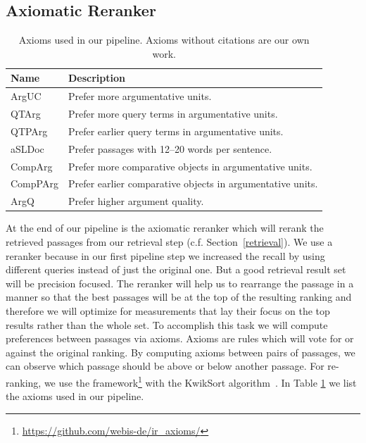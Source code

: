 \subsection{Axiomatic Reranker}

\begin{table}
    \caption{Axioms used in our pipeline. Axioms without citations are our own work.}
    \label{table-axioms}
    \begin{tabular}{ll}
        \toprule
        \textbf{Name} & \textbf{Description} \\
        \midrule
        ArgUC~\cite{BondarenkoHVSPB2018} & Prefer more argumentative units. \\
        QTArg~\cite{BondarenkoHVSPB2018} & Prefer more query terms in argumentative units. \\
        QTPArg~\cite{BondarenkoHVSPB2018} & Prefer earlier query terms in argumentative units. \\
        aSLDoc~\cite{BondarenkoFKHVS2019} & Prefer passages with 12--20 words per sentence. \\
        CompArg & Prefer more comparative objects in argumentative units. \\
        CompPArg & Prefer earlier comparative objects in argumentative units. \\
        ArgQ & Prefer higher argument quality. \\ 
        \bottomrule
    \end{tabular}
\end{table}

At the end of our pipeline is the axiomatic reranker which will rerank the retrieved passages from our retrieval step (c.f. Section~\ref{retrieval}).
We use a reranker because in our first pipeline step we increased the recall by using different queries instead of just the original one.
But a good retrieval result set will be precision focused.
The reranker will help us to rearrange the passage in a manner so that the best passages will be at the top of the resulting ranking and therefore we will optimize for measurements that lay their focus on the top results rather than the whole set.
To accomplish this task we will compute preferences between passages via axioms.
Axioms are rules which will vote for or against the original ranking.
By computing axioms between pairs of passages, we can observe which passage should be above or below another passage.
For re-ranking, we use the \iraxioms framework\footnote{\url{https://github.com/webis-de/ir_axioms/}} with the KwikSort algorithm~\cite{HagenVGS2016}.
In Table \ref{table-axioms} we list the axioms used in our pipeline.

